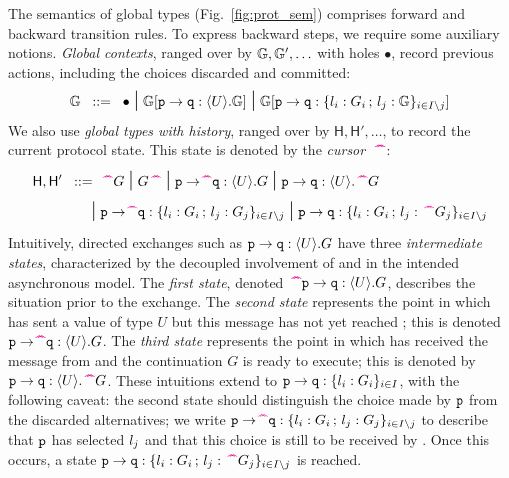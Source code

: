 \documentclass[runningheads]{llncs}
\begin{document}
The semantics of global types (Fig.~\ref{fig:prot_sem})
comprises forward and backward transition rules. 
To express backward steps, we require some auxiliary notions.
\emph{Global contexts}, ranged over by $\mathbb{G}, \mathbb{G}', \ldots$ with holes $\bullet$,  record
previous actions, including the choices discarded and committed:
$$
\mathbb{G}
\;\;::=\;\;   
\bullet 
\;\mbox{\Large{$\mid$}}\;  
\mathbb{G}[\mathtt{p}\to\mathtt{q}:\langle U\rangle.\mathbb{G}]
\;\mbox{\Large{$\mid$}}\;
\mathbb{G}[\mathtt{p}\to\mathtt{q}:\{l_i:G_i \,;\, l_j:\mathbb{G}\}_{i \in I\setminus j} ]
$$
We also use \emph{global types with history}, ranged over by $\mathsf{H}, \mathsf{H}', \ldots$, 
  to record the current protocol state. 
This state is denoted by the \emph{cursor}~$\,\textcolor{magenta}{\text{\textbf{\textasciicircum\!\!\textasciicircum}}}$:
\begin{align*}
			\mathsf{H}, \mathsf{H}'  \bnfis & 			\past G \sbnfbar	G \past 
			\sbnfbar 
			\gtcom{p}{\!\!\past q}{U}{G} 
			\sbnfbar 
			\gtcom{p}{q}{U}{\past G} 
			\\\sbnfbar & 
			\gpart{p}\to\!\!\past\gpart{q}:\{\lbl_i:G_i \,;\, \lbl_j:G_j\}_{i \in I\setminus j} 
			\sbnfbar
 			\gpart{p}\to\gpart{q}:\{\lbl_i:G_i \,;\, \lbl_j:\past G_j\}_{i \in I\setminus j}  
\end{align*}
Intuitively,  directed exchanges such as $\mathtt{p}\to\mathtt{q}:\langle U\rangle.G$ have three \emph{intermediate states},
characterized by the decoupled involvement of \p and \q in the intended asynchronous model.
The \emph{first state}, denoted $\,\textcolor{magenta}{\text{\textbf{\textasciicircum\!\!\textasciicircum}}} \mathtt{p}\to\mathtt{q}:\langle U\rangle.G$, describes the situation prior to the exchange.
The \emph{second state} represents the point in which \p has sent a value of type $U$ but this message has not yet
reached \q; this is denoted $\mathtt{p}\to\mathtt{\!\!\,\textcolor{magenta}{\text{\textbf{\textasciicircum\!\!\textasciicircum}}} q}:\langle U\rangle.G$.
The \emph{third state} represents the point in which \q has received the message from \p and
the continuation $G$ is ready to execute; this is denoted by $\mathtt{p}\to\mathtt{q}:\langle U\rangle.\,\textcolor{magenta}{\text{\textbf{\textasciicircum\!\!\textasciicircum}}} G$.
These intuitions extend to $\mathtt{p}\to\mathtt{q}:\{l_i:G_i\}_{i \in I}$, with the following caveat:
the second state should distinguish the choice made by $\mathtt{p}$ from the discarded alternatives; 
  we write $\mathtt{p}\to\!\!\,\textcolor{magenta}{\text{\textbf{\textasciicircum\!\!\textasciicircum}}}\mathtt{q}:\{l_i:G_i \,;\, l_j:G_j\}_{i \in I\setminus j}$ to describe that $\mathtt{p}$ has selected $l_j$ and that this choice is still to be received by \q. Once this occurs, a state
  $\mathtt{p}\to\mathtt{q}:\{l_i:G_i \,;\, l_j:\,\textcolor{magenta}{\text{\textbf{\textasciicircum\!\!\textasciicircum}}} G_j\}_{i \in I\setminus j}$ is reached.
\end{document}
